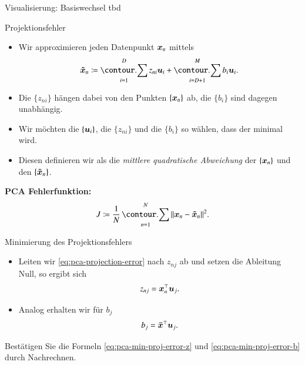 \begin{frame}{Visualisierung: Basiswechsel}{}
	tbd
\end{frame}


\begin{frame}{Projektionsfehler}{}
	\begin{itemize}
		\item Wir approximieren jeden Datenpunkt $\bm{x}_n$ mittels
		\begin{equation} \label{eq:pca-approximation-data-point}
			\bxtilde_n \coloneqq \sum_{i=1}^D z_{ni} \bu_i + \sum_{i=D+1}^M b_i \bu_i.
		\end{equation}
		\item Die $\{ z_{ni} \}$ hängen dabei von den Punkten $\{ \bm{x}_n \}$ ab, die $\{ b_i \}$ sind dagegen unabhängig.
		\item Wir möchten die $\{ \bm{u}_i \}$, die $\{ z_{ni} \}$ und die $\{ b_i \}$ so wählen, dass der  minimal wird.
		\item Diesen definieren wir als die \textit{mittlere quadratische Abweichung} der $\{ \bm{x}_n \}$ und den $\{ \bm{\tilde{x}}_n \}$.
	\end{itemize}
	
	\begin{boxGray}
		\textbf{PCA Fehlerfunktion:}
		\begin{equation} \label{eq:pca-projection-error}
			J \coloneqq \frac{1}{N} \sum_{n=1}^N \Vert \bx_n - \bxtilde_n \Vert^2.
		\end{equation}
	\end{boxGray}
\end{frame}


\begin{frame}{Minimierung des Projektionsfehlers}{}
	\begin{itemize}
		\item Leiten wir \eqref{eq:pca-projection-error} nach $z_{nj}$ ab und setzen die Ableitung Null, so ergibt sich
		\begin{equation} \label{eq:pca-min-proj-error-z}
			z_{nj} = \bm{x}_n^\top \bm{u}_j.
		\end{equation}
		\item Analog erhalten wir für $b_j$
		\begin{equation} \label{eq:pca-min-proj-error-b}
			b_j = \bm{\bar{x}}^\top \bm{u}_j.
		\end{equation}
	\end{itemize}

	\begin{mytask}
		Bestätigen Sie die Formeln \eqref{eq:pca-min-proj-error-z} und \eqref{eq:pca-min-proj-error-b} durch Nachrechnen.
	\end{mytask}
\end{frame}


